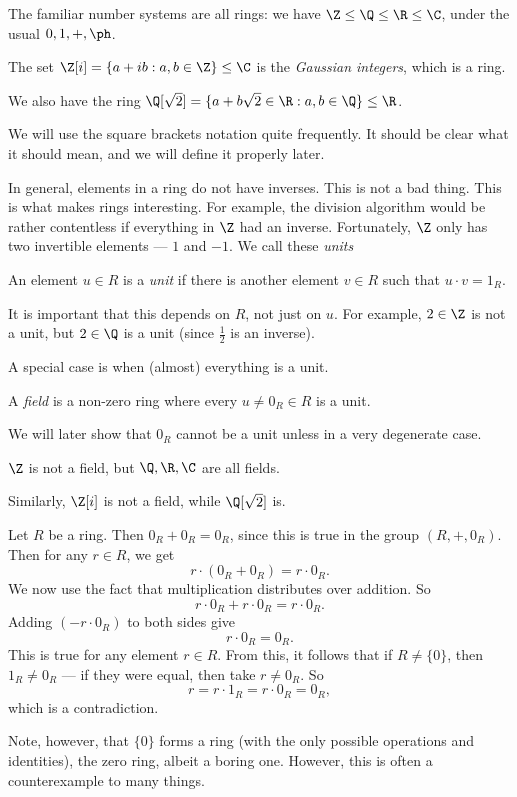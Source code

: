 \documentclass[a4paper]{article}
\begin{document}
\begin{eg}
  The familiar number systems are all rings: we have $\Z \leq \Q \leq \R \leq \C$, under the usual $0, 1, +, \ph$.
\end{eg}

\begin{eg}
  The set $\Z[i] = \{a + ib: a, b \in \Z\} \leq \C$ is the \emph{Gaussian integers}, which is a ring.

  We also have the ring $\Q[\sqrt{2}] = \{a + b \sqrt{2} \in \R: a, b \in \Q\} \leq \R$.
\end{eg}
We will use the square brackets notation quite frequently. It should be clear what it should mean, and we will define it properly later.

In general, elements in a ring do not have inverses. This is not a bad thing. This is what makes rings interesting. For example, the division algorithm would be rather contentless if everything in $\Z$ had an inverse. Fortunately, $\Z$ only has two invertible elements --- $1$ and $-1$. We call these \emph{units}

\begin{defi}[Unit]
  An element $u \in R$ is a \emph{unit} if there is another element $v \in R$ such that $u \cdot v = 1_R$.
\end{defi}
It is important that this depends on $R$, not just on $u$. For example, $2 \in \Z$ is not a unit, but $2 \in \Q$ is a unit (since $\frac{1}{2}$ is an inverse).

A special case is when (almost) everything is a unit.
\begin{defi}[Field]
  A \emph{field} is a non-zero ring where every $u \not= 0_R \in R$ is a unit.
\end{defi}
We will later show that $0_R$ cannot be a unit unless in a very degenerate case.

\begin{eg}
  $\Z$ is not a field, but $\Q, \R, \C$ are all fields.

  Similarly, $\Z[i]$ is not a field, while $\Q[\sqrt{2}]$ is.
\end{eg}

\begin{eg}
  Let $R$ be a ring. Then $0_R + 0_R = 0_R$, since this is true in the group $(R, +, 0_R)$. Then for any $r \in R$, we get
  \[
    r\cdot (0_R + 0_R) = r\cdot 0_R.
  \]
  We now use the fact that multiplication distributes over addition. So
  \[
    r \cdot 0_R + r \cdot 0_R = r \cdot 0_R.
  \]
  Adding $(-r \cdot 0_R)$ to both sides give
  \[
    r \cdot 0_R = 0_R.
  \]
  This is true for any element $r \in R$. From this, it follows that if $R \not= \{0\}$, then $1_R \not= 0_R$ --- if they were equal, then take $r \not= 0_R$. So
  \[
    r = r \cdot 1_R = r \cdot 0_R = 0_R,
  \]
  which is a contradiction.
\end{eg}
Note, however, that $\{0\}$ forms a ring (with the only possible operations and identities), the zero ring, albeit a boring one. However, this is often a counterexample to many things.
\end{document}
